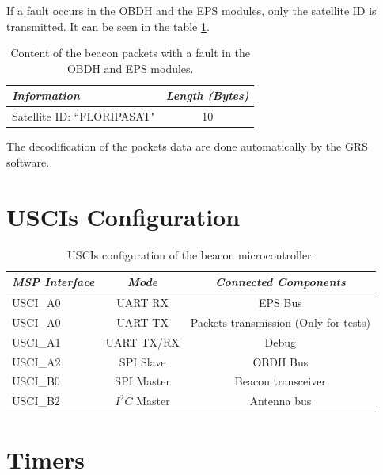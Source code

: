 \documentclass[12pt]{book}
\begin{document}
If a fault occurs in the OBDH and the EPS modules, only the satellite ID is transmitted. It can be seen in the table \ref{tab:beacon-without-eps-payload}.

\begin{table}[!h]
	\begin{center}
		\begin{tabular}{lc}
			\toprule[1.5pt]
			\textit{Information} & \textit{Length (Bytes)} \\
			\midrule
			Satellite ID: ``FLORIPASAT" & 10 \\
			\bottomrule[1.5pt]
		\end{tabular}
		\caption{Content of the beacon packets with a fault in the OBDH and EPS modules.}
		\label{tab:beacon-without-eps-payload}
	\end{center}
\end{table}

The decodification of the packets data are done automatically by the GRS software.

\section{USCIs Configuration}

\begin{table}[!h]
	\begin{center}
		\begin{tabular}{lcc}
			\toprule[1.5pt]
			\textit{MSP Interface} & \textit{Mode} & \textit{Connected Components} \\
			\midrule
			USCI\_A0 & UART RX & EPS Bus \\
			USCI\_A0 & UART TX & Packets transmission (Only for tests) \\
			USCI\_A1 & UART TX/RX & Debug \\
			USCI\_A2 & SPI Slave & OBDH Bus \\
			USCI\_B0 & SPI Master & Beacon transceiver \\
			USCI\_B2 & $I^{2}C$ Master & Antenna bus  \\
			\bottomrule[1.5pt]
		\end{tabular}
		\caption{USCIs configuration of the beacon microcontroller.}
		\label{tab:beacon-uc-usci-config}
	\end{center}
\end{table}

\section{Timers}
\end{document}
